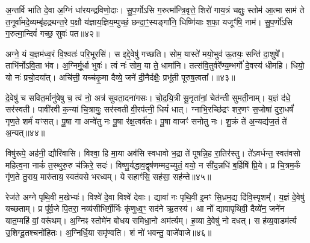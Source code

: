अ॒न्तर्वि भा॑ति दे॒वा अ॒ग्निं धा॑रयन्द्रविणो॒दाः। सु॒प॒र्णो\-ऽसि ग॒रुत्मा᳚न्त्रि॒वृत्ते॒ शिरो॑ गाय॒त्रं चक्षुः॒ स्तोम॑ आ॒त्मा साम॑ ते त॒नूर्वा॑मदे॒व्यम्बृ॑हद्रथन्त॒रे प॒क्षौ य॑ज्ञाय॒ज्ञिय॒म्पुच्छं॒ छन्दा॒ꣳ॒स्यङ्गा॑नि॒ धिष्णि॑याः श॒फा॒ यजूꣳ॑षि॒ नाम॑। सु॒प॒र्णो॑\-ऽसि ग॒रुत्मा॒न्दिवं॑ गच्छ॒ सुवः॑ पत॥४२॥

{\anuvakamend[{नाभा॒ वने॒ येन॑ यामि॒ क्षामा॑ रु॒क्मो᳚\-ऽष्टात्रिꣳ॑शच्च॥10॥}]}

अग्ने॒ यं य॒ज्ञम॑ध्व॒रं वि॒श्वतः॑ परि॒भूरसि॑। स इद्दे॒वेषु॑ गच्छति। सोम॒ यास्ते॑ मयो॒भुव॑ ऊ॒तयः॒ सन्ति॑ दा॒शुषे᳚। ताभि॑र्नो\-ऽवि॒ता भ॑व। अ॒ग्निर्मू॒र्धा भुवः॑। त्वं नः॑ सोम॒ या ते॒ धामा॑नि। तत्स॑वि॒तुर्वरे᳚ण्य॒म्भर्गो॑ दे॒वस्य॑ धीमहि। धियो॒ यो नः॑ प्रचो॒दया᳚त्। अचि॑त्ती॒ यच्च॑कृ॒मा दैव्ये॒ जने॑ दी॒नैर्दक्षैः॒ प्रभू॑ती पूरुष॒त्वता᳚।॥४३॥

दे॒वेषु॑ च सवित॒र्मानु॑षेषु च॒ त्वं नो॒ अत्र॑ सुवता॒दना॑गसः। चो॒द॒यि॒त्री सू॒नृता॑नां॒ चेत॑न्ती सुमती॒नाम्। य॒ज्ञं द॑धे॒ सर॑स्वती। पावी॑रवी क॒न्या॑ चि॒त्रायुः॒ सर॑स्वती वी॒रप॑त्नी॒ धियं॑ धात्। ग्नाभि॒रच्छि॑द्रꣳ शर॒णꣳ स॒जोषा॑ दुरा॒धर्\mbox{}षं॑ गृण॒ते शर्म॑ यꣳसत्। पू॒षा गा अन्वे॑तु नः पू॒षा र॑क्ष॒त्वर्व॑तः। पू॒षा वाजꣳ॑ सनोतु नः। शु॒क्रं ते॑ अ॒न्यद्य॑ज॒तं ते॑ अ॒न्यत्॥४४॥

विषु॑रूपे॒ अह॑नी॒ द्यौरि॑वासि। विश्वा॒ हि मा॒या अव॑सि स्वधावो भ॒द्रा ते॑ पूषन्नि॒ह रा॒तिर॑स्तु। ते॑\-ऽवर्धन्त॒ स्वत॑वसो महित्व॒ना नाकं॑ त॒स्थुरु॒रु च॑क्रिरे॒ सदः॑। विष्णु॒र्यद्धाव॒द्वृष॑णम्मद॒च्युतं॒ वयो॒ न सी॑द॒न्नधि॑ ब॒र्\mbox{}हिषि॑ प्रि॒ये। प्र चि॒त्रम॒र्कं गृ॑ण॒ते तु॒राय॒ मारु॑ताय॒ स्वत॑वसे भरध्वम्। ये सहाꣳ॑सि॒ सह॑सा॒ सह॑न्ते॥४५॥

रेज॑ते अग्ने पृथि॒वी म॒खेभ्यः॑। विश्वे॑ दे॒वा विश्वे॑ देवाः। द्यावा॑ नः पृथि॒वी इ॒मꣳ सि॒ध्रम॒द्य दि॑वि॒स्पृशम्᳚। य॒ज्ञं दे॒वेषु॑ यच्छताम्। प्र पू᳚र्व॒जे पि॒तरा॒ नव्य॑सीभिर्गी॒र्भिः कृ॑णुध्व॒ꣳ॒ सद॑ने ऋ॒तस्य॑। आ नो᳚ द्यावापृथिवी॒ दैव्ये॑न॒ जने॑न यात॒म्महि॑ वां॒ वरू॑थम्। अ॒ग्निꣴ स्तोमे॑न बोधय समिधा॒नो अम॑र्त्यम्। ह॒व्या दे॒वेषु॑ नो दधत्। स ह॑व्य॒वाडम॑र्त्य उ॒शिग्दू॒तश्चनो॑हितः। अ॒ग्निर्धि॒या समृ॑ण्वति। शं नो॑ भवन्तु॒ वाजे॑वाजे॥४६॥

{\anuvakamend[{पू॒रु॒ष॒त्वता॑ यज॒तन्ते॑ अ॒न्यथ्सह॑न्ते॒ चनो॑हितो॒\-ऽष्टौ च॑॥11॥}]}


{}

